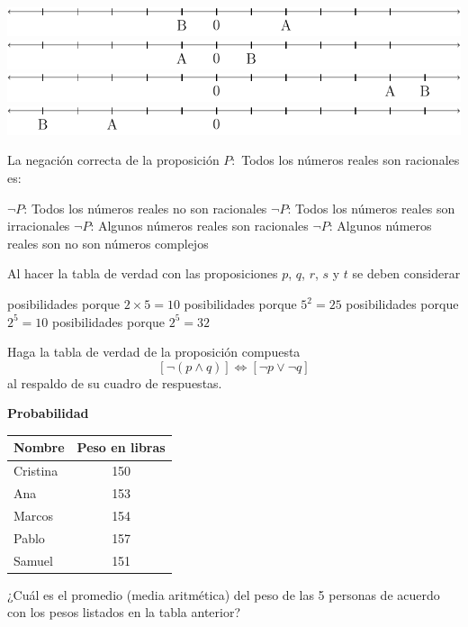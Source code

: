 \documentclass[10pt,letterpaper,addpoints]{exam}
\begin{document}
\begin{multicols}{2}
\begin{questions}
\begin{choices}
\CorrectChoice \includegraphics[scale=.5]{Images/respA.pdf} 
\choice \includegraphics[scale=.5]{Images/respB.pdf} 
\choice \includegraphics[scale=.5]{Images/respC.pdf} 
\choice \includegraphics[scale=.5]{Images/respD.pdf} 
  \end{choices}
  \question
  La negación correcta de la proposición $P:$ Todos los números reales son racionales es:
  \begin{choices}
  \choice $\neg P$: Todos los números reales no son racionales
  \choice $\neg P$: Todos los números reales son irracionales
  \CorrectChoice $\neg P$: Algunos números reales son racionales
  \choice $\neg P$: Algunos números reales son no son números complejos 
\end{choices}  
\question Al hacer la tabla de verdad con las proposiciones $p$, $q$, $r$, $s$ y $t$ se deben considerar
\begin{choices}
 posibilidades porque $2\times 5=10$
 posibilidades porque $5^{2}=25$
 posibilidades porque $2^{5}=10$
 posibilidades porque $2^{5}=32$
\end{choices}
\question Haga la tabla de verdad de la proposición compuesta 
\[[\neg(p\wedge q)]\Longleftrightarrow [\neg p \vee \neg q]\]
al respaldo de su cuadro de respuestas.

\large \textbf{Probabilidad}

\begin{center}
\begin{tabular}{|l|c|}
\hline 
\textbf{Nombre} & Peso en libras \\ 
\hline 
Cristina & 150 \\ 
\hline 
Ana & 153 \\ 
\hline 
Marcos & 154 \\ 
\hline 
Pablo & 157 \\ 
\hline 
Samuel & 151 \\ 
\hline 
\end{tabular} 
\end{center}
\question ¿Cuál es el promedio (media aritmética) del peso de las 5 personas de acuerdo con los pesos listados en la tabla anterior?


\end{questions}
\end{multicols}
\end{document}
